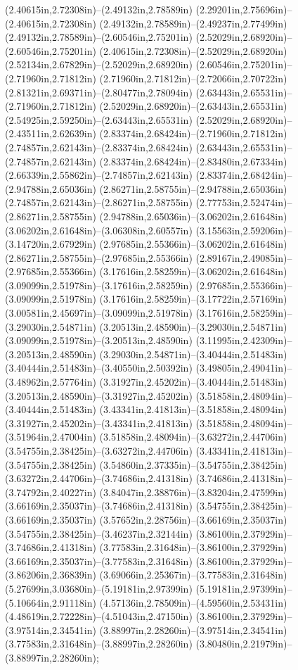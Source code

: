 (2.40615in,2.72308in)--(2.49132in,2.78589in) (2.29201in,2.75696in)--(2.40615in,2.72308in) (2.49132in,2.78589in)--(2.49237in,2.77499in) (2.49132in,2.78589in)--(2.60546in,2.75201in) (2.52029in,2.68920in)--(2.60546in,2.75201in) (2.40615in,2.72308in)--(2.52029in,2.68920in) (2.52134in,2.67829in)--(2.52029in,2.68920in) (2.60546in,2.75201in)--(2.71960in,2.71812in) (2.71960in,2.71812in)--(2.72066in,2.70722in) (2.81321in,2.69371in)--(2.80477in,2.78094in) (2.63443in,2.65531in)--(2.71960in,2.71812in) (2.52029in,2.68920in)--(2.63443in,2.65531in) (2.54925in,2.59250in)--(2.63443in,2.65531in) (2.52029in,2.68920in)--(2.43511in,2.62639in) (2.83374in,2.68424in)--(2.71960in,2.71812in) (2.74857in,2.62143in)--(2.83374in,2.68424in) (2.63443in,2.65531in)--(2.74857in,2.62143in) (2.83374in,2.68424in)--(2.83480in,2.67334in) (2.66339in,2.55862in)--(2.74857in,2.62143in) (2.83374in,2.68424in)--(2.94788in,2.65036in) (2.86271in,2.58755in)--(2.94788in,2.65036in) (2.74857in,2.62143in)--(2.86271in,2.58755in) (2.77753in,2.52474in)--(2.86271in,2.58755in) (2.94788in,2.65036in)--(3.06202in,2.61648in) (3.06202in,2.61648in)--(3.06308in,2.60557in) (3.15563in,2.59206in)--(3.14720in,2.67929in) (2.97685in,2.55366in)--(3.06202in,2.61648in) (2.86271in,2.58755in)--(2.97685in,2.55366in) (2.89167in,2.49085in)--(2.97685in,2.55366in) (3.17616in,2.58259in)--(3.06202in,2.61648in) (3.09099in,2.51978in)--(3.17616in,2.58259in) (2.97685in,2.55366in)--(3.09099in,2.51978in) (3.17616in,2.58259in)--(3.17722in,2.57169in) (3.00581in,2.45697in)--(3.09099in,2.51978in) (3.17616in,2.58259in)--(3.29030in,2.54871in) (3.20513in,2.48590in)--(3.29030in,2.54871in) (3.09099in,2.51978in)--(3.20513in,2.48590in) (3.11995in,2.42309in)--(3.20513in,2.48590in) (3.29030in,2.54871in)--(3.40444in,2.51483in) (3.40444in,2.51483in)--(3.40550in,2.50392in) (3.49805in,2.49041in)--(3.48962in,2.57764in) (3.31927in,2.45202in)--(3.40444in,2.51483in) (3.20513in,2.48590in)--(3.31927in,2.45202in) (3.51858in,2.48094in)--(3.40444in,2.51483in) (3.43341in,2.41813in)--(3.51858in,2.48094in) (3.31927in,2.45202in)--(3.43341in,2.41813in) (3.51858in,2.48094in)--(3.51964in,2.47004in) (3.51858in,2.48094in)--(3.63272in,2.44706in) (3.54755in,2.38425in)--(3.63272in,2.44706in) (3.43341in,2.41813in)--(3.54755in,2.38425in) (3.54860in,2.37335in)--(3.54755in,2.38425in) (3.63272in,2.44706in)--(3.74686in,2.41318in) (3.74686in,2.41318in)--(3.74792in,2.40227in) (3.84047in,2.38876in)--(3.83204in,2.47599in) (3.66169in,2.35037in)--(3.74686in,2.41318in) (3.54755in,2.38425in)--(3.66169in,2.35037in) (3.57652in,2.28756in)--(3.66169in,2.35037in) (3.54755in,2.38425in)--(3.46237in,2.32144in) (3.86100in,2.37929in)--(3.74686in,2.41318in) (3.77583in,2.31648in)--(3.86100in,2.37929in) (3.66169in,2.35037in)--(3.77583in,2.31648in) (3.86100in,2.37929in)--(3.86206in,2.36839in) (3.69066in,2.25367in)--(3.77583in,2.31648in) (5.27699in,3.03680in)--(5.19181in,2.97399in) (5.19181in,2.97399in)--(5.10664in,2.91118in) (4.57136in,2.78509in)--(4.59560in,2.53431in) (4.48619in,2.72228in)--(4.51043in,2.47150in) (3.86100in,2.37929in)--(3.97514in,2.34541in) (3.88997in,2.28260in)--(3.97514in,2.34541in) (3.77583in,2.31648in)--(3.88997in,2.28260in) (3.80480in,2.21979in)--(3.88997in,2.28260in);
